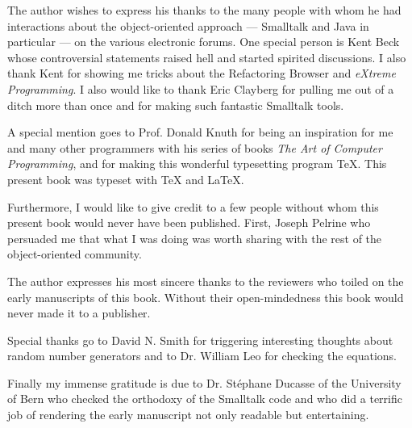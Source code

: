 \documentclass[twoside]{book}
\begin{document}
%
The author wishes to express his
thanks to the many people with whom he had interactions about the
object-oriented approach --- Smalltalk and Java in particular ---
on the various electronic forums. One special person is Kent Beck
whose controversial statements raised hell and started spirited
discussions. I also thank Kent for showing me tricks about the
Refactoring Browser and {\sl eXtreme Programming}. I also would
like to thank Eric Clayberg for pulling me out of a ditch more
than once and for making such fantastic Smalltalk tools.

A special mention goes to Prof. Donald Knuth for being an
inspiration for me and many other programmers with his series of
books {\sl The Art of Computer Programming}, and for making this
wonderful typesetting program \TeX. This present book was typeset
with \TeX{} and \LaTeX.

Furthermore, I would like to give credit to a few people without
whom this present book would never have been published. First,
Joseph Pelrine who persuaded me that what I was doing was worth
sharing with the rest of the object-oriented community.

The author expresses his most sincere thanks to the reviewers who
toiled on the early manuscripts of this book. Without their
open-mindedness this book would never made it to a publisher.

Special thanks go to David N. Smith for triggering interesting
thoughts about random number generators and to Dr. William Leo for
checking the equations.

Finally my immense gratitude is due to Dr. St\'ephane Ducasse of the
University of Bern who checked the orthodoxy of the Smalltalk code
and who did a terrific job of rendering the early manuscript not
only readable but entertaining.

\vspace{5 ex}


\ifx\wholebook\relax\else
\end{document}
